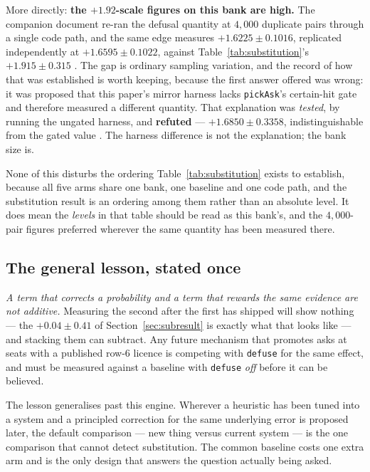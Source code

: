\documentclass[11pt]{article}
\newcommand{\code}[1]{\texttt{#1}}
\begin{document}
More directly: \textbf{the $+1.92$-scale figures on this bank are high.} The companion
document re-ran the defusal quantity at $4{,}000$ duplicate pairs through a single code
path, and the same edge measures $+1.6225 \pm 0.1016$, replicated independently at
$+1.6595 \pm 0.1022$, against Table~\ref{tab:substitution}'s $+1.915 \pm 0.315$
\cite{concession}. The gap is ordinary sampling variation, and the record of how that was
established is worth keeping, because the first answer offered was wrong: it was proposed
that this paper's mirror harness lacks \code{pickAsk}'s certain-hit gate and therefore
measured a different quantity. That explanation was \emph{tested}, by running the ungated
harness, and \textbf{refuted} --- $+1.6850 \pm 0.3358$, indistinguishable from the gated
value \cite{concession}. The harness difference is not the explanation; the bank size is.

None of this disturbs the ordering Table~\ref{tab:substitution} exists to establish,
because all five arms share one bank, one baseline and one code path, and the substitution
result is an ordering among them rather than an absolute level. It does mean the
\emph{levels} in that table should be read as this bank's, and the $4{,}000$-pair figures
preferred wherever the same quantity has been measured there.

\subsection{The general lesson, stated once}
\label{sec:lesson}

\emph{A term that corrects a probability and a term that rewards the same evidence are not
additive.} Measuring the second after the first has shipped will show nothing --- the
$+0.04 \pm 0.41$ of Section~\ref{sec:subresult} is exactly what that looks like --- and
stacking them can subtract. Any future mechanism that promotes asks at seats with a
published row-6 licence is competing with \code{defuse} for the same effect, and must be
measured against a baseline with \code{defuse} \emph{off} before it can be believed.

The lesson generalises past this engine. Wherever a heuristic has been tuned into a
system and a principled correction for the same underlying error is proposed later, the
default comparison --- new thing versus current system --- is the one comparison that
cannot detect substitution. The common baseline costs one extra arm and is the only design
that answers the question actually being asked.
\end{document}
